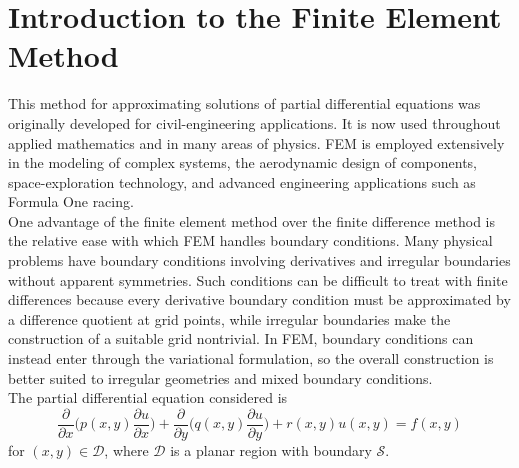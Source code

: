\documentclass[a4paper]{article}
\begin{document}
\section{Introduction to the Finite Element Method}
This method for approximating solutions of partial differential equations was originally developed for civil-engineering applications. It is now used throughout applied mathematics and in many areas of physics. FEM is employed extensively in the modeling of complex systems, the aerodynamic design of components, space-exploration technology, and advanced engineering applications such as Formula One racing.\\

One advantage of the finite element method over the finite difference method is the relative ease with which FEM handles boundary conditions. Many physical problems have boundary conditions involving derivatives and irregular boundaries without apparent symmetries. Such conditions can be difficult to treat with finite differences because every derivative boundary condition must be approximated by a difference quotient at grid points, while irregular boundaries make the construction of a suitable grid nontrivial. In FEM, boundary conditions can instead enter through the variational formulation, so the overall construction is better suited to irregular geometries and mixed boundary conditions.\\

The partial differential equation considered is
\begin{equation}\label{eq::partial_diff_equation}
\frac{\partial}{\partial x}\Bigg( p(x,y)\frac{\partial u}{\partial x} \Bigg) + \frac{\partial}{\partial y}\Bigg( q(x,y)\frac{\partial u}{\partial y} \Bigg) +r(x,y)u(x,y)=f(x,y)
\end{equation}
for $(x,y)\in \mathcal{D}$, where $\mathcal{D}$ is a planar region with boundary $\mathcal{S}$.\\
\end{document}

